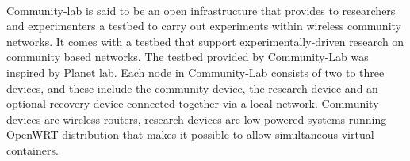 \paragraph{}
Community-lab is said to be an open infrastructure that provides to researchers and experimenters a testbed to carry out experiments within wireless community networks\cite{Rameshan:2013:MSC:2508222.2512838}.
It comes with a testbed that support experimentally-driven research on community based networks\cite{Braem:2013:CRC:2500098.2500108}.
The testbed provided by Community-Lab was inspired by Planet lab\cite{7076582,Braem:2015:AEQ:2830629.2830639}.
Each node in Community-Lab consists of two to three devices, and these include the community device, the research device and an optional recovery device connected together via a local network\cite{Rameshan:2013:MSC:2508222.2512838}.
Community devices are wireless routers, research devices are low powered systems running OpenWRT distribution that makes it possible to allow simultaneous virtual containers\cite{Rameshan:2013:MSC:2508222.2512838}.
